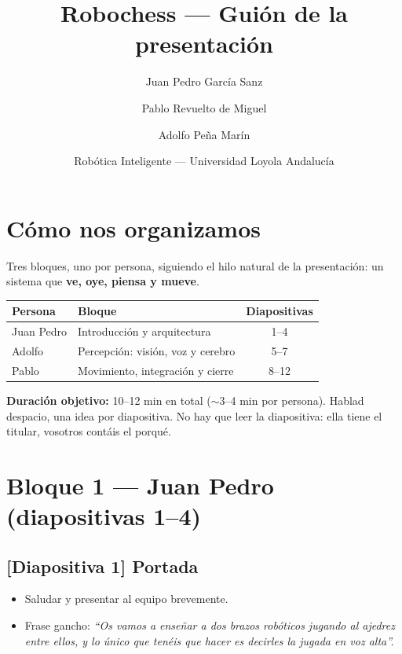 \documentclass[11pt]{article}
\title{\textbf{Robochess} --- Guión de la presentación}
\author{Juan Pedro García Sanz \and Pablo Revuelto de Miguel \and Adolfo Peña Marín}
\date{Robótica Inteligente --- Universidad Loyola Andalucía}
\newcommand{\slide}[1]{\textbf{\color{azul}[Diapositiva #1]}}
\begin{document}
\maketitle

\section*{Cómo nos organizamos}

\noindent
Tres bloques, uno por persona, siguiendo el hilo natural de la presentación:
un sistema que \textbf{ve, oye, piensa y mueve}.

\begin{center}
\begin{tabular}{@{}llc@{}}
\toprule
\textbf{Persona} & \textbf{Bloque} & \textbf{Diapositivas} \\
\midrule
Juan Pedro & Introducción y arquitectura        & 1--4  \\
Adolfo     & Percepción: visión, voz y cerebro  & 5--7  \\
Pablo      & Movimiento, integración y cierre   & 8--12 \\
\bottomrule
\end{tabular}
\end{center}

\noindent
\textbf{Duración objetivo:} 10--12 min en total ($\sim$3--4 min por persona).
Hablad despacio, una idea por diapositiva. No hay que leer la diapositiva:
ella tiene el titular, vosotros contáis el porqué.

\bigskip
\section{Bloque 1 --- Juan Pedro (diapositivas 1--4)}

\subsection{\slide{1} Portada}
\begin{itemize}
    \item Saludar y presentar al equipo brevemente.
    \item Frase gancho: \emph{``Os vamos a enseñar a dos brazos robóticos
          jugando al ajedrez entre ellos, y lo único que tenéis que hacer es
          decirles la jugada en voz alta''.}
\end{itemize}
\end{document}
